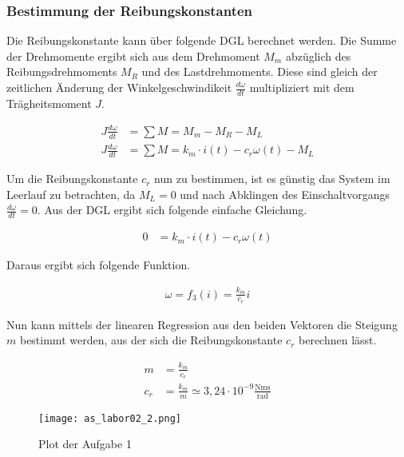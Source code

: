 \subsubsection{Bestimmung der Reibungskonstanten}

Die Reibungskonstante kann über folgende DGL berechnet werden.
Die Summe der Drehmomente ergibt sich aus dem Drehmoment $M_m$
abzüglich des Reibungsdrehmoments $M_R$ und des Lastdrehmoments.
Diese sind gleich der zeitlichen Änderung der Winkelgeschwindikeit 
$\frac{d \omega}{dt}$ multipliziert mit dem Trägheitsmoment $J$.

\begin{equation} \label{eq221}
    \begin{split}
        J \frac{d \omega}{d t} &= \sum M = M_m - M_R - M_L \\
        J \frac{d \omega}{d t} &= \sum M = k_m \cdot i(t) - c_r \omega (t) - M_L 
    \end{split}
\end{equation}

Um die Reibungskonstante $c_r$ nun zu bestimmen, ist es günstig das
System im Leerlauf zu betrachten, da $M_L=0$ und nach Abklingen des
Einschaltvorgangs $\frac{d\omega}{dt} =0$. Aus der DGL ergibt sich
folgende einfache Gleichung.

\begin{equation} \label{eq222}
    \begin{split}
        0 & = k_m \cdot i(t) - c_r \omega (t)
    \end{split}
\end{equation}

Daraus ergibt sich folgende Funktion.

\begin{equation} \label{eq222}
    \begin{split}
        \omega = f_3(i) = \frac{k_m}{c_r} i
    \end{split}
\end{equation}

Nun kann mittels der linearen Regression aus den beiden Vektoren die Steigung
$m$ bestimmt werden, aus der sich die Reibungskonstante $c_r$ berechnen lässt.

\begin{equation} \label{eq218}
    \begin{split}
       m &=  \frac{k_m}{c_r}\\
       c_r &= \frac{k_m}{m} \simeq 3,24 \cdot 10^{-9} \mathrm{\frac{Nm s}{rad}}
    \end{split}
\end{equation}

\begin{figure}[H]
 \centering
    \texttt{[image: as\_labor02\_2.png]}
 \caption{Plot der Aufgabe 1}
 \label{fig:PlotAufgabe1}
\end{figure}